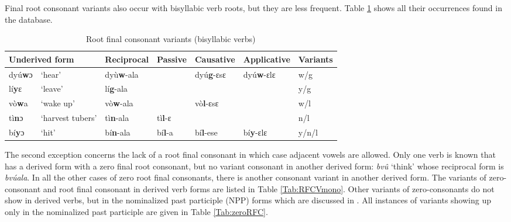 Final root consonant variants also occur with bisyllabic verb roots, but they are less frequent. Table \ref{Tab:RFCVbi} shows all their occurrences found in the database.

\begin{table} 
\centering
\small
\begin{tabular}{ll|llll|l}
\multicolumn{2}{l|}{Underived form}  & Reciprocal         & Passive & Causative & Applicative & Variants \\
 \midrule
dyú{\bfseries w}ɔ & `hear' &  dyù{\bfseries w}-ala & 	&   dyú{\bfseries g}-ɛsɛ & dyú{\bfseries w}-ɛlɛ & w/g \\
lí{\bfseries y}ɛ & `leave' &  lí{\bfseries g}-ala & 	& 	& 	& y/g \\
vò{\bfseries w}a & `wake up' &  vò{\bfseries w}-ala	& 	&  vò{\bfseries l}-ɛsɛ 	& 	& w/l \\
tì{\bfseries n}ɔ &  `harvest tubers' &  tì{\bfseries n}-ala &  tì{\bfseries l}-ɛ & 	& 	& n/l \\
bí{\bfseries y}ɔ &  `hit' &  bí{\bfseries n}-ala &  bí{\bfseries l}-a &  bí{\bfseries l}-ese &  bí{\bfseries y}-ɛlɛ & y/n/l \\
 \midrule
\end{tabular}
\caption{Root final consonant variants (bisyllabic verbs)}
\label{Tab:RFCVbi}
\end{table} 

The second exception concerns the lack of a root final consonant in which case adjacent vowels are allowed. Only one verb is known that has a derived form with a zero final root consonant, but no variant consonant in another derived form: {\itshape bvû} `think' whose reciprocal form is {\itshape bvúala}.
In all the other cases of zero root final consonants, there is another consonant variant in another derived form. The variants of zero-consonant and root final consonant in derived verb forms are listed in Table \ref{Tab:RFCVmono}. Other variants of zero-consonants do not show in derived verbs, but in the nominalized past participle (NPP) forms which are discussed in . All instances  of variants showing up only in the nominalized past participle are given in Table \ref{Tab:zeroRFC}.


